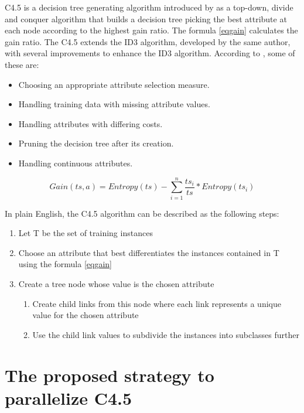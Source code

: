 \documentclass[conference]{IEEEtran}
\begin{document}
C4.5 is a decision tree generating algorithm introduced by \cite{quinlan} as a top-down, divide and conquer algorithm that builds a decision tree picking the best attribute at each node according to the highest gain ratio. The formula \eqref{eqgain} calculates the gain ratio. The C4.5 extends the ID3 algorithm, developed by the same author, with several improvements to enhance the ID3 algorithm. According to \cite{quinlan}, some of these are:

\begin{itemize}
    \item Choosing an appropriate attribute selection measure.
    \item Handling training data with missing attribute values.
    \item Handling attributes with differing costs.
    \item Pruning the decision tree after its creation.
    \item Handling continuous attributes.
\end{itemize}

\begin{equation}
Gain(ts, a) = Entropy(ts) - \sum_{i=1}^{n} \frac{ts_i}{ts} * Entropy(ts_i) \label{eqgain}
\end{equation}

In plain English, the C4.5 algorithm can be described as the following steps:
\begin{enumerate}
    \item Let T be the set of training instances
    \item Choose an attribute that best differentiates the instances contained in T using the formula \eqref{eqgain}
    \item Create a tree node whose value is the chosen attribute
    \begin{enumerate}
        \item Create child links from this node where each link represents a unique value for the chosen attribute
        \item Use the child link values to subdivide the instances into subclasses further
    \end{enumerate}
\end{enumerate}

\section{The proposed strategy to parallelize C4.5}
\end{document}
